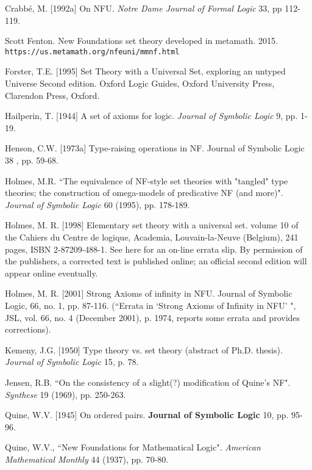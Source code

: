 \documentclass[112pt]{article}
\begin{document}
\begin{thebibliography}{99}


  Crabb\'{e}, M. [1992a]
On NFU.
{\em Notre Dame Journal of Formal Logic\/} 33, pp 112-119. 

  Scott Fenton.  New Foundations set theory developed in metamath.  2015.  {\tt https://us.metamath.org/nfeuni/mmnf.html}

  Forster, T.E. [1995] 
Set Theory with a Universal Set, exploring an untyped Universe 
Second edition. Oxford Logic Guides, Oxford University Press, Clarendon Press, Oxford.

 Hailperin, T. [1944]
A set of axioms for logic.
{\em Journal of Symbolic Logic\/} 9, pp. 1-19.

 

   Henson, C.W. [1973a] 
Type-raising operations in NF. 
Journal of Symbolic Logic 38 , pp. 59-68.

  Holmes, M.R.
``The equivalence of NF-style set theories with "tangled" type theories; the construction of omega-models of predicative NF (and more)". 
{\em Journal of Symbolic Logic\/} 60 (1995), pp. 178-189.

  Holmes, M. R. [1998] 
Elementary set theory with a universal set. 
volume 10 of the Cahiers du Centre de logique, Academia, Louvain-la-Neuve (Belgium), 241 pages, ISBN 2-87209-488-1. See here for an on-line errata slip. By permission of the publishers, a corrected text is published online; an official second edition will appear online eventually.

   Holmes, M. R. [2001]
Strong Axioms of infinity in NFU.
Journal of Symbolic Logic, 66, no. 1, pp. 87-116.  \newline(``Errata in `Strong
Axioms of Infinity in NFU' ", JSL, vol. 66, no. 4 (December
2001), p. 1974, reports some errata and provides corrections).

  Kemeny, J.G. [1950]
Type theory vs. set theory (abstract of Ph.D. thesis).
{\em Journal of Symbolic Logic\/} 15, p. 78. 

  Jensen, R.B.
``On the consistency of a slight(?) modification of Quine's NF". 
{\em Synthese\/} 19 (1969), pp. 250-263.

  Quine, W.V. [1945]
On ordered pairs.
{\bf Journal of Symbolic Logic\/} 10, pp. 95-96. 

  Quine, W.V.,
``New Foundations for Mathematical Logic". 
{\em American Mathematical Monthly\/} 44 (1937), pp. 70-80. 


\end{thebibliography}
\end{document}
